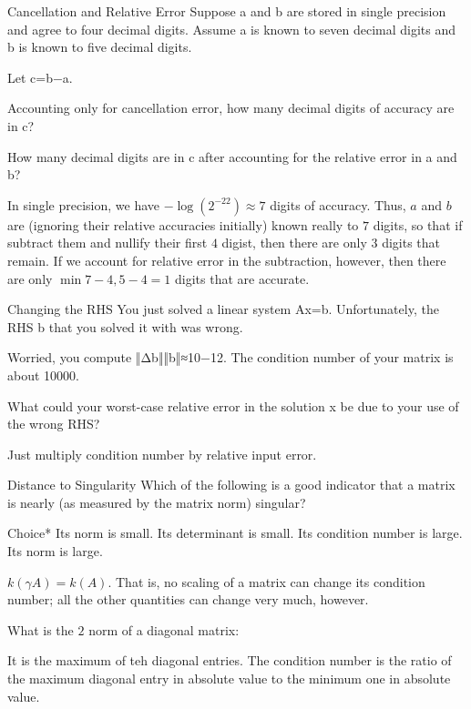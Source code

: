\documentclass[../main.tex]{subfiles}
\begin{document}
Cancellation and Relative Error
Suppose a and b are stored in single precision and agree to four decimal digits. Assume a is known to seven decimal digits and b is known to five decimal digits.

Let c=b−a.

Accounting only for cancellation error, how many decimal digits of accuracy are in c?


How many decimal digits are in c after accounting for the relative error in a and b?

\begin{solution}
    In single precision, we have $-\log(2^{-22}) \approx 7$ digits of accuracy. Thus, $a$ and $b$ are (ignoring their relative accuracies initially) known really to $7$ digits, so that if subtract them and nullify their first $4$ digist, then there are only $3$ digits that remain. If we account for relative error in the subtraction, however, then there are only $\min{7-4, 5-4} = 1$ digits that are accurate.
\end{solution}

Changing the RHS
You just solved a linear system Ax=b. Unfortunately, the RHS b that you solved it with was wrong.

Worried, you compute
‖Δb‖‖b‖≈10−12.
The condition number of your matrix is about 10000.

What could your worst-case relative error in the solution x be due to your use of the wrong RHS?

\begin{solution}
    Just multiply condition number by relative input error.
\end{solution}

Distance to Singularity
Which of the following is a good indicator that a matrix is nearly (as measured by the matrix norm) singular?

Choice*
Its norm is small.
Its determinant is small.
Its condition number is large.
Its norm is large.

\begin{solution}
    $k(\gamma A) = k(A)$. That is, no scaling of a matrix can change its condition number; all the other quantities can change very much, however.
\end{solution}


What is the $2$ norm of a diagonal matrix:

\begin{solution}
    It is the maximum of teh diagonal entries. The condition number is the ratio of the maximum diagonal entry in absolute value to the minimum one in absolute value.
\end{solution}
\end{document}

